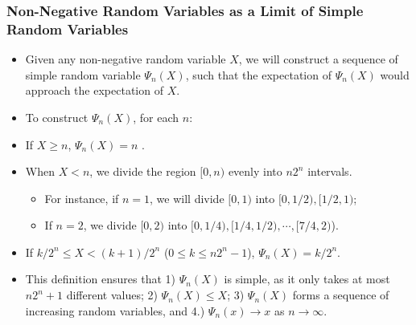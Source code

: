 \documentclass[handout]{beamer}
\begin{document}
\frame
{
\frametitle{Non-Negative Random Variables as a Limit of Simple Random Variables}

\begin{itemize}

\item<1->[-] Given any non-negative random variable $X$, we will construct a sequence of simple random variable $\Psi_n(X)$, such that the expectation of  $\Psi_n(X)$ would approach the expectation of $X$.
                         
\item<2->[-]  To construct $\Psi_n(X)$, for each $n$:
                          
\item<2->[-]  If $X\geq n$, $\Psi_n(X)=n$ . 
                         
\item<3->[-]  When $X<n$, we divide the region $[0,n)$ evenly into $n 2^n$ intervals.
\begin{itemize}
\item For instance, if $n=1$, we will divide $[0,1)$ into $[0,1/2), [1/2,1)$; 
\item If $n=2$, we divide $[0,2)$ into $[0,1/4), [1/4, 1/2),\cdots, [7/4, 2)$). 
\end{itemize}
                         
\item<4->[-]  If $k/2^n\leq X< (k+1)/2^n$ ($0\leq k\leq n2^n-1$),  $\Psi_n(X)=k/2^n$.                    
                                
\item<5-> This definition ensures that 1) $\Psi_n(X)$ is simple, as it only takes at most $n2^n+1$ different values; 2) $\Psi_n(X)\leq X$; 3) $\Psi_n(X)$ forms a sequence of increasing random variables, and 4.) $\Psi_n(x)\rightarrow x$ as $n\rightarrow \infty$. 
                                                                                                                                 \end{itemize}
}
\end{document}
